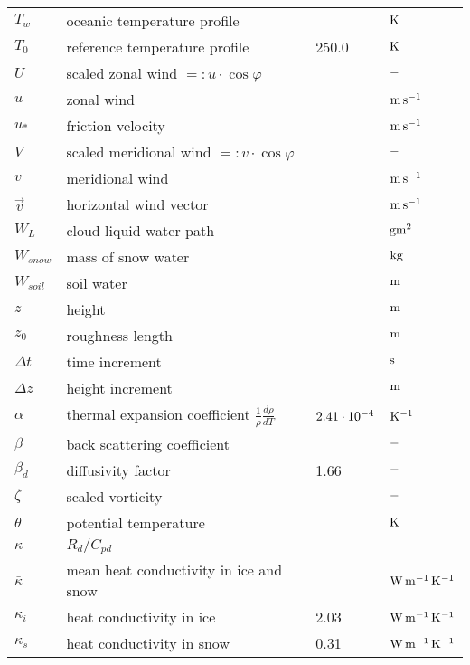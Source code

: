 \newpage
\begin{tabular*}{\textwidth}{l@{\extracolsep\fill}lll}

$T_w$          & oceanic temperature profile                &         &
$\rm K$ \\
$T_0$          & reference temperature profile         &  250.0  & $\rm K$
\\

$U$       & scaled zonal wind $=:u\cdot\cos\varphi$    &         & $\rm -$ \\
$u$       & zonal wind                       &         & $\rm m\, s^{-1}$
\\
$u_*$          & friction velocity                          &         & $\rm m\, s^{-1}$ \\

$V$       & scaled meridional wind $=:v\cdot\cos\varphi$    &         & $\rm -$ \\
$v$       & meridional wind                  &         & $\rm m\, s^{-1}$
\\
$\vec{v}$      & horizontal wind vector                &         & $\rm m\, s^{-1}$
\\
$W_L$     & cloud liquid water path     &    & $\rm g m^2$ \\
$W_{snow}$ & mass of snow water    &    & $\rm kg $\\
$W_{soil}$     & soil water             &    & $\rm  m $\\
$z$       & height                      &    & $\rm m$ \\
$z_0$          & roughness length            &    & $\rm m$ \\
$\Delta t $    & time increment              &    & $\rm s$ \\
 $\Delta z $   & height increment            &    &$\rm  m$ \\
$\alpha$  & thermal expansion coefficient $\frac{1}{\rho} \frac{d\rho}{dT}$ & $\rm
2.41\cdot 10^{-4}$ & $\rm K^{-1}$ \\
$\beta$   & back scattering coefficient &         &$\rm - $\\
$\beta_d$      & diffusivity factor          & 1.66    &$\rm - $ \\
$\zeta$   & scaled vorticity                      &         & $\rm -$ \\
$\theta$  & potential temperature            &         & $\rm K$ \\
$\kappa$  & $R_d/C_{pd}$                               &         & $\rm -$ \\
$\bar{\kappa}$      & mean heat conductivity in ice and snow     &         & $\rm W\,
m^{-1}\, K^{-1}$ \\
$\kappa_i$     & heat conductivity in ice              &  2.03   & $\rm W\, m^{-1}\,
K^{-1}$ \\
$\kappa_s$     & heat conductivity in snow             &  0.31   & $\rm W\,
m^{-1}\, K^{-1}$ \\


\end{tabular*}
